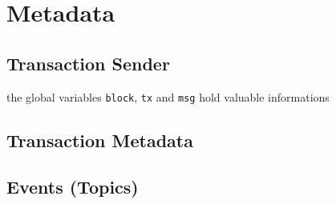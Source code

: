 \section{Metadata} \label{sec:static-metadata}

\subsection{Transaction Sender}

the global variables \lstinline[language=Solidity]{block}, \lstinline[language=Solidity]{tx} and \lstinline[language=Solidity]{msg} hold valuable informations

\subsection{Transaction Metadata}

\subsection{Events (Topics)}
